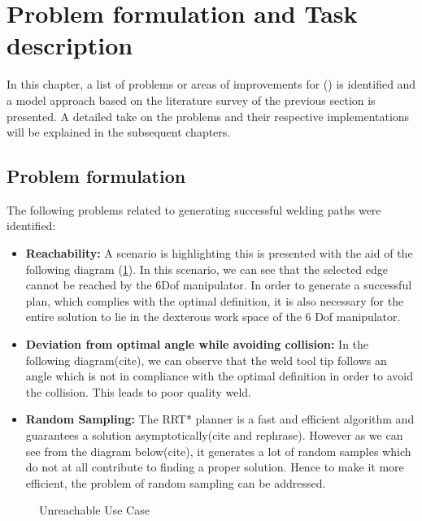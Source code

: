 \section{Problem formulation and Task description}
\localtableofcontents
\label{sec:pf}
In this chapter, a list of problems or areas of improvements for (\citet{DiazP2016}) is identified and a model approach based on the literature survey of the previous section is presented. A detailed take on the problems and their respective implementations will be explained in the subsequent chapters.
\subsection{Problem formulation}
The following problems related to generating successful welding paths were identified:
\begin{itemize}
\item \textbf{Reachability:} A scenario is highlighting this is presented with the aid of the following diagram (\ref{fig:pf1}). In this scenario, we can see that the selected edge cannot be reached by the 6Dof manipulator. In order to generate a successful plan, which complies with the optimal definition, it is also necessary for the entire solution to lie in the dexterous work space of the 6 Dof manipulator.
\item \textbf{Deviation from optimal angle while avoiding collision:} In the following diagram(cite), we can observe that the weld tool tip follows an angle which is not in compliance with the optimal definition in order to avoid the collision. This leads to poor quality weld.
\item \textbf{Random Sampling:} The RRT* planner is a fast and efficient algorithm and guarantees  a solution asymptotically(cite and rephrase). However as we can see from the diagram below(cite), it generates a lot of random samples which do not at all contribute to finding a proper solution. Hence to make it more efficient, the problem of random sampling can be addressed.
\end{itemize}
\begin{figure}[!ht] %
	\centering
	\caption{Unreachable Use Case}
	\label{fig:pf1}
\end{figure} 

